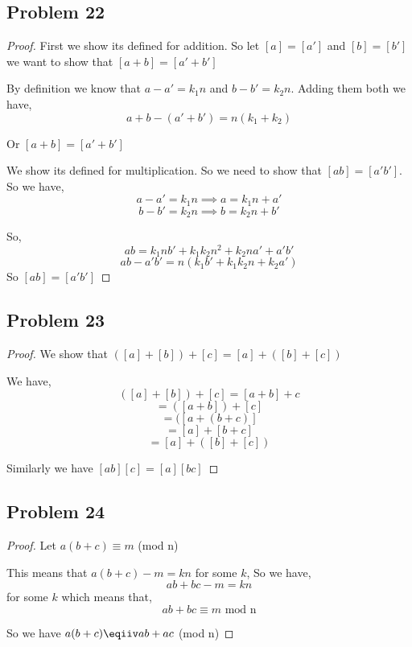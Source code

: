 \documentclass[a4paper]{report}
\begin{document}
\subsection*{Problem 22}
\begin{proof}
    First we show its defined for addition. So let $[a] = [a']$ and $[b] = [b']$ we want to show that  $[a + b] = [a' + b']$

    By definition we know that $a - a' = k_1n$ and $b - b' = k_2n$. Adding them both we have, 
    $$ a + b - (a'  + b') = n(k_1 + k_2)$$

    Or $[a + b] = [a' + b']  $

    We show its defined for multiplication. So we need to show that $[ab] = [a'b']$. So we have, 
    $$ a - a' = k_1n \implies a = k_1n + a'$$ 
    $$ b - b' = k_2n \implies b = k_2n + b'$$ 


    So, 
    $$ ab = k_1nb' + k_1k_2n^2 + k_2na' + a'b' $$ 
    $$ ab - a'b' = n(k_1b' + k_1k_2n + k_2a') $$ 
    So $[ab] = [a'b']$
\end{proof}

\subsection*{Problem 23}
\begin{proof}
    We show that $([a] + [b]) + [c] = [a] + ([b ]+ [c])$

    We have, 
    $$ ([a] + [b]) + [c] = [a + b] + c  $$ 
    $$ =([a + b]) + [c] $$ 
    $$ =([a + (b + c)] $$ 
    $$ =[a] + [b + c] $$ 
    $$ =[a] + ([b] + [c]) $$ 


    Similarly we have $[ab][c] = [a][bc]$
\end{proof}


\subsection*{Problem 24}
\begin{proof}
    Let $a(b+c) \equiv m $ (mod n)

    This means that  $a(b + c) - m = kn$ for some  $k$, So we have,  
    $$ ab + bc - m = kn $$  for some $k$ which means that,  
    $$ ab + bc \equiv m \text{ mod n}$$  

    So we have $a(b + c) \eqiiv ab + ac $ (mod n)
\end{proof}
\end{document}
